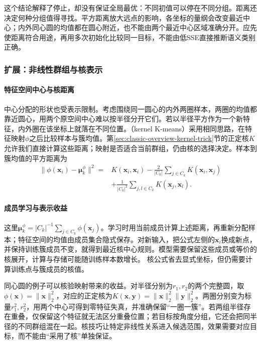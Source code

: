 这个结论解释了停止，却没有保证全局最优：不同初值可以停在不同分组。距离还决定何种分组值得寻找。平方距离放大远点的影响，各坐标的量纲会改变最近中心；内外同心圆的均值都在圆心附近，也不能由两个最近中心区域准确分开。应先使距离符合用途，再用多次初始化比较同一目标，不能由低SSE直接推断语义类别正确。
\subsubsection{扩展：非线性群组与核表示}

\paragraph{特征空间中心与核距离}

中心分配的形状也受表示限制。考虑围绕同一圆心的内外两圈样本，两圈的均值都靠近圆心，用两个原空间中心难以按半径分开它们。若以半径平方作为一个新特征，内外圈在该坐标上就落在不同位置。（kernel K-means）采用相同思路，在特征映射$\phi$之后比较样本与簇均值。第\ref{sec:classic-overview-kernel-trick}节的正定核$K$允许我们直接计算这些距离；映射是否适合当前群组，仍由核的选择决定。样本到簇均值的平方距离为
\begin{equation}
 \begin{aligned}
 \lVert\phi(\bm{x}_i)-\bm{\mu}_k^\phi\rVert^2
 ={}&K(\bm{x}_i,\bm{x}_i)
 -\frac{2}{|C_k|}\sum_{j\in C_k}K(\bm{x}_i,\bm{x}_j)\\
 &+\frac{1}{|C_k|^2}
   \sum_{j,l\in C_k}K(\bm{x}_j,\bm{x}_l).
 \end{aligned}
 \label{eq:clustering-kernel-kmeans}
\end{equation}

\paragraph{成员学习与表示收益}

这里$\bm\mu_k^\phi=|C_k|^{-1}\sum_{j\in C_k}\phi(\bm x_j)$。学习时用当前成员计算上述距离，再重新分配样本；特征空间的均值由成员集合隐式保存。对新输入，把公式左侧的$\bm x_i$换成新点，并保持训练簇成员不变，就得到最近核中心规则。模型需要保留这些成员或等价的核展开，计算与存储可能随训练样本数增长。
核公式省去显式坐标，但仍需要计算训练点与簇成员的核值。

同心圆的例子可以核验映射带来的收益。对半径分别为$r_1,r_2$的两个完整圆，取$\phi(\bm x)=\lVert\bm x\rVert_2^2$，对应的正定核为$K(\bm x,\bm y)=\lVert\bm x\rVert_2^2\lVert\bm y\rVert_2^2$。两圈分别变为标量$r_1^2,r_2^2$，用两个中心可得到零特征失真，并准确保留“一圈一簇”。若两组半径存在重叠，仅保留这个特征就无法区分重叠位置；若目标按角度分组，它还会把同半径的不同群组混在一起。核技巧让特定非线性关系进入候选范围，效果需要对应目标，而不能由“采用了核”单独保证。

